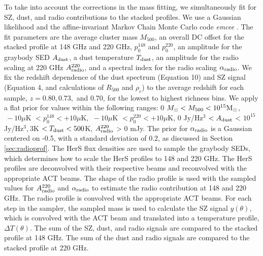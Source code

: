 \documentclass[a4paper,fleqn,usenatbib]{mnras}
\begin{document}
To take into account the corrections in the mass fitting, we simultaneously fit for SZ, dust, and radio contributions to the stacked profiles. 
We use a Gaussian likelihood and the affine-invariant Markov Chain Monte Carlo code \textit{emcee} \citep{2013PASP..125..306F}. 
The fit parameters are the average cluster mass $M_{500}$, an overall DC offset for the stacked profile at 148 GHz and 220 GHz, $p_0^{148}$ and $p_0^{220}$, an amplitude for the graybody SED $A_{\rm dust}$, a dust temperature $T_{\rm dust}$, an amplitude for the radio scaling at 220 GHz $A_{\rm radio}^{220}$, and a spectral index for the radio scaling $\alpha_{\rm radio}$. 
We fix the redshift dependence of the dust spectrum (Equation 10) and SZ signal (Equation 4, and calculations of $R_{500}$ and $\rho_c$) to the average redshift for each sample, $z = 0.80, 0.73,$ and 0.70, for the lowest to highest richness bins. 
We apply a flat prior for values within the following ranges: 0 $M_{\odot} <  M_{500} < 10^{15} \rm M_{\odot}$,$\ -10 \mu$K $< p_0^{148} < +10 \mu$K, $\ -10 \mu$K $< p_0^{220} < +10 \mu$K, 0 Jy/Hz$^3$ $< A_{\rm dust}$ < $10^{15}$ Jy/Hz$^3$,$\ 3 $K $< T_{\rm dust} < 500$K, $A_{\rm radio}^{220}$ > 0 mJy.
The prior for $\alpha_{\rm radio}$ is a Gaussian centered on -0.5, with a standard deviation of 0.2, as discussed in Section \ref{sec:radioprof}. 
The HerS flux densities are used to sample the graybody SEDs, which determines how to scale the HerS profiles to 148 and 220 GHz. 
The HerS profiles are deconvolved with their respective beams and reconvolved with the appropriate ACT beams.
The shape of the radio profile is used with the sampled values for $A_{\rm radio}^{220}$ and $\alpha_{\rm radio}$ to estimate the radio contribution at 148 and 220 GHz.
The radio profile is convolved with the appropriate ACT beams.
For each step in the sampler, the sampled mass is used to calculate the SZ signal $y(\theta)$, which is convolved with the ACT beam and translated into a temperature profile, $\Delta T(\theta)$.
The sum of the SZ, dust, and radio signals are compared to the stacked profile at 148 GHz. 
The sum of the dust and radio signals are compared to the stacked profile at 220 GHz.
\end{document}
